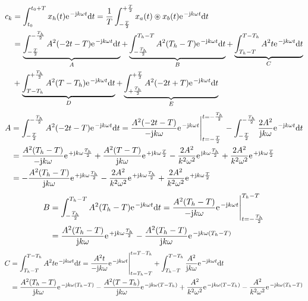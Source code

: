 \documentclass[11pt,a4paper,DIV=12]{scrartcl}
\begin{document}
%
%
%
\begin{align}
	c_k&=\int_{t_0}^{t_0+T}x_{h}(t)\e^{-\im k \omega t}\diff t=\frac{1}{T}\int_{-\frac{T}{2}}^{+\frac{T}{2}}x_{a}(t)\circledast x_{b}(t)\e^{-\im k \omega t}\diff t\nonumber \\
	&=\underbrace{\int_{-\frac{T}{2}}^{-\frac{T_h}{2}}A^2(-2t-T)\e^{-\im k \omega t}\diff t}_A+\underbrace{\int_{-\frac{T_h}{2}}^{T_h-T}A^2(T_h-T)\e^{-\im k \omega t}\diff t}_B+\underbrace{\int_{T_h-T}^{T-T_h}A^2t\e^{-\im k \omega t}\diff t}_C\nonumber \\
	&+\underbrace{\int_{T-T_h}^{+\frac{T_h}{2}}A^2(T-T_h)\e^{-\im k \omega t}\diff t}_D+\underbrace{\int_{+\frac{T_h}{2}}^{+\frac{T}{2}}A^2(-2t+T)\e^{-\im k \omega t}\diff t}_E
\end{align}
%
%
%
\begin{align}
	A&=\int_{-\frac{T}{2}}^{-\frac{T_h}{2}}A^2(-2t-T)\e^{-\im k \omega t}\diff t=\frac{A^2(-2t-T)}{-\im k \omega}\e^{-\im k \omega t}\Bigg |_{t=-\frac{T}{2}}^{t=-\frac{T_h}{2}}-\int_{-\frac{T}{2}}^{-\frac{T_h}{2}}\frac{2A^2}{\im k \omega}\e^{-\im k \omega t}\diff t\nonumber \\
	&=\frac{A^2(T_h-T)}{-\im k \omega}\e^{+\im k \omega \frac{T_h}{2}}+\frac{A^2(T-T)}{\im k \omega}\e^{+\im k \omega \frac{T}{2}}-\frac{2A^2}{k^2\omega^2}\e^{\im k \omega \frac{T_h}{2}}+\frac{2A^2}{k^2\omega^2}\e^{+\im k \omega \frac{T}{2}}\nonumber \\
	&=-\frac{A^2(T_h-T)}{\im k \omega}\e^{+\im k \omega \frac{T_h}{2}}-\frac{2A^2}{k^2\omega^2}\e^{+\im k \omega \frac{T_h}{2}}+\frac{2A^2}{k^2\omega^2}\e^{+\im k \omega \frac{T}{2}}
\end{align}
%
%
%
\begin{align}
	B&=\int_{-\frac{T_h}{2}}^{T_h-T}A^2(T_h-T)\e^{-\im k \omega t}\diff t = \frac{A^2(T_h-T)}{-\im k \omega}\e^{-\im k \omega t}\Bigg |_{t=-\frac{T_h}{2}}^{T_h-T}\nonumber \\
	&=\frac{A^2(T_h-T)}{\im k \omega}\e^{+\im k \omega \frac{T_h}{2}}-\frac{A^2(T_h-T)}{\im k \omega}\e^{-\im k \omega (T_h-T)}
\end{align}
%
%
%
\begin{align}
	C&=\int_{T_h-T}^{T-T_h}A^2t\e^{-\im k \omega t}\diff t=\frac{A^2t}{-\im k \omega }\e^{-\im k \omega t}\Bigg |_{t=T_h-T}^{t=T-T_h}+\int_{T_h-T}^{T-T_h}\frac{A^2}{\im k \omega}\e^{-\im k \omega t}\diff t\nonumber \\
	&=\frac{A^2(T_h-T)}{\im k \omega}\e^{-\im k \omega (T_h-T)}-\frac{A^2(T-T_h)}{\im k \omega}\e^{-\im k \omega (T-T_h)}+\frac{A^2}{k^2\omega^2}\e^{-\im k \omega (T-T_h)}-\frac{A^2}{k^2\omega^2}\e^{-\im k \omega (T_h-T)}
\end{align}
\end{document}
